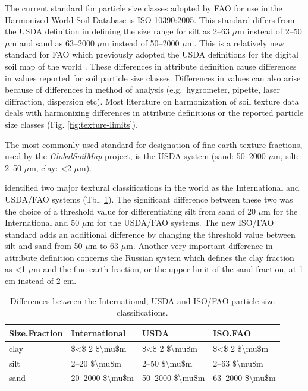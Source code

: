 \documentclass[graybox,natbib,nospthms,UStrade]{svmono}
\let\BeginKnitrBlock\begin \let\EndKnitrBlock\end
\let\BeginKnitrBlock\begin \let\EndKnitrBlock\end
\begin{document}
The current standard for particle size classes adopted by FAO for use in
the Harmonized World Soil Database is ISO 10390:2005. This standard
differs from the USDA definition in defining the size range for silt as
2--63 \(\mu\)m instead of 2--50 \(\mu\)m and sand as 63--2000 \(\mu\)m instead of
50--2000 \(\mu\)m. This is a relatively
new standard for FAO which previously adopted the USDA definitions for
the digital soil map of the world \citep{Nachtergaele2010press}. These
differences in attribute definition cause differences in values reported
for soil particle size classes. Differences in values can also arise
because of differences in method of analysis (e.g.~hygrometer, pipette,
laser diffraction, dispersion etc). Most literature on harmonization of soil
texture data deals with harmonizing differences in attribute definitions
or the reported particle size classes
(Fig. \ref{fig:texture-limits}).

\BeginKnitrBlock{rmdnote}
The most commonly used standard for designation of fine earth texture
fractions, used by the \emph{GlobalSoilMap} project, is the USDA
system (sand: 50--2000 \(\mu\)m, silt: 2--50 \(\mu\)m, clay: \textless{}2 \(\mu\)m).
\EndKnitrBlock{rmdnote}

\citet{Minasny2001AJSR} identified two major textural classifications in the
world as the International and USDA/FAO systems (Tbl. \ref{tab:usdafaotexture}).
The significant difference between these two was the choice of a
threshold value for differentiating silt from sand of 20 \(\mu\)m for the
International and 50 \(\mu\)m for the USDA/FAO systems. The new ISO/FAO standard
adds an additional difference by changing the threshold value between
silt and sand from 50 \(\mu\)m to 63 \(\mu\)m. Another very important difference in attribute
definition concerns the Russian system which defines the clay fraction
as \textless{}1 \(\mu\)m and the fine earth fraction, or the upper limit of the sand
fraction, at 1 cm instead of 2 cm.

\begin{table}[t]

\caption{\label{tab:usdafaotexture}Differences between the International, USDA and ISO/FAO particle size classifications.}
\centering
\begin{tabular}{llll}
\toprule
Size.Fraction & International & USDA & ISO.FAO\\
\midrule
clay & \$<\$ 2 \$\textbackslash{}mu\$m & \$<\$ 2 \$\textbackslash{}mu\$m & \$<\$ 2 \$\textbackslash{}mu\$m\\
silt & 2–20 \$\textbackslash{}mu\$m & 2–50 \$\textbackslash{}mu\$m & 2–63 \$\textbackslash{}mu\$m\\
sand & 20–2000 \$\textbackslash{}mu\$m & 50–2000 \$\textbackslash{}mu\$m & 63–2000 \$\textbackslash{}mu\$m\\
\bottomrule
\end{tabular}
\end{table}
\end{document}
